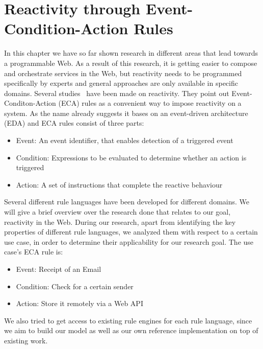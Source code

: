 \section{Reactivity through Event-Condition-Action Rules}
In this chapter we have so far shown research in different areas that lead towards a programmable Web.
As a result of this research, it is getting easier to compose and orchestrate services in the Web, but reactivity needs to be programmed specifically by experts and general approaches are only available in specific domains.
Several studies~\cite{2007_AlferesR3}\cite{2005-Bry_etal-XChange.pdf}\cite{10.1007-11896548_63}\cite{papamarkos2004rdftl}\cite{2012-Paschke_etal-ReactionRuleML.pdf} have been made on reactivity.
They point out Event-Conditon-Action (\textrm{ECA}) rules as a convenient way to impose reactivity on a system.
As the name already suggests it bases on an event-driven architecture (\textrm{EDA}) and \textrm{ECA} rules consist of three parts:
\begin{itemize}
  \item Event: An event identifier, that enables detection of a triggered event
  \item Condition: Expressions to be evaluated to determine whether an action is triggered
  \item Action: A set of instructions that complete the reactive behaviour
\end{itemize}

Several different rule languages have been developed for different domains.
We will give a brief overview over the research done that relates to our goal, reactivity in the Web.
During our research, apart from identifying the key properties of different rule languages, we analyzed them with respect to a certain use case, in order to determine their applicability for our research goal.
The use case's ECA rule is:
\begin{itemize}
  \item Event: Receipt of an Email%
  \item Condition: Check for a certain sender
  \item Action: Store it remotely via a Web API
\end{itemize}
We also tried to get access to existing rule engines for each rule language, since we aim to build our model as well as our own reference implementation on top of existing work.


